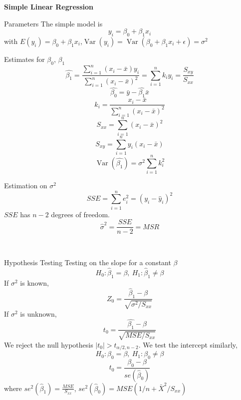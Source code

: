 \documentclass{article}
\title{}
\DeclareMathOperator{\Var}{Var}
\begin{document}
\begin{center}{\large{\textbf{Simple Linear Regression}}}\\
\end{center}




\begin{multicols*}{3}

    \begin{blackbox}{Parameters}
        The simple model is \\[-3ex]
        \[y_i = \beta_0 + \beta_1x_i\]
        with $E(y_i) = \beta_0 + \beta_1x_i$,$\Var(y_i) = \Var(\beta_0 + \beta_1x_i + \epsilon) = \sigma^2$
        \begin{redbox}{Estimates for $\beta_0$, $\beta_1$}
            \[\hat{\beta_1}= \frac{\sum_{i=1}^n(x_i - \bar{x})y_i}{\sum_{i=1}^n (x_i - \bar{x})^2} = \sum_{i=1}^n k_iy_i = \frac{S_{xy}}{S_{xx}}\]
            \[\hat{\beta_0} = \bar{y} - \hat{\beta_1}\bar{x}\]
            \[k_i = \frac{x_i - \bar{x}}{\sum_{i=1}^n(x_i - \bar{x})^2}\]
            \[S_{xx} = \sum_{i=1}^n (x_i - \bar{x})^2\]
            \[S_{xy} = \sum_{i=1}^n y_i(x_i - \bar{x})\]
            \[\Var(\hat{\beta_1}) = \sigma^2\sum_{i=1}^nk_i^2\]
        \end{redbox}
        \begin{bluebox}{Estimation on $\sigma^2$}
            \[SSE = \sum_{i=1}^ne_i^2 = (y_i-\hat{y}_i)^2\]
            $SSE$ has $n-2$ degrees of freedom.
            \[\hat{\sigma}^2 = \frac{SSE}{n-2} = MSR\]
        \end{bluebox}\\[-2ex]
    \end{blackbox}
    \begin{blackbox}{Hypothesis Testing}
        Testing on the slope for a constant $\beta$
        \[H_0: \hat{\beta}_1 = \beta, \ H_1: \hat{\beta}_1 \neq \beta\]
        If $\sigma^2$ is known,\\[-4ex]
        \[Z_0 = \frac{\hat{\beta}_1 - \beta}{\sqrt{\sigma^2/S_{xx}}}\]
        If $\sigma^2$ is unknown,\\[-4ex]
        \[t_0 = \frac{\hat{\beta_1} - \beta}{\sqrt{MSE/S_{xx}}}\]
        We reject the null hypothesis $|t_0| > t_{\alpha/2, n-2}$. We test the intercept similarly,\\[-2ex]
        \[H_0: \beta_0 = \beta, \ H_1: \beta_0 \neq \beta\]
        \[t_0 = \frac{\beta_0 -  \beta}{se(\hat{\beta}_0)}\]
        where $se^2(\hat{\beta}_1) = \frac{MSE}{S_{xx}}$, $se^2(\hat{\beta}_0) = MSE(1/n + \bar{X}^2/S_{xx})$

\end{blackbox}
\end{multicols*}
\end{document}
